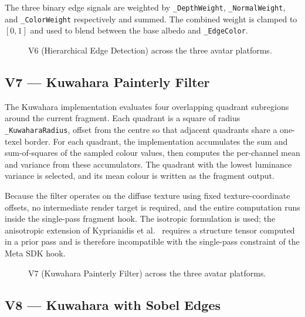 The three binary edge signals are weighted by \texttt{\_DepthWeight}, \texttt{\_NormalWeight}, and \texttt{\_ColorWeight} respectively and summed. The combined weight is clamped to $[0,1]$ and used to blend between the base albedo and \texttt{\_EdgeColor}.

\begin{figure}[H]
  \centering
  \caption{V6 (Hierarchical Edge Detection) across the three avatar platforms.}
  \label{fig:v6_impl}
\end{figure}

\subsection{V7 — Kuwahara Painterly Filter}
\label{sec:impl_v7}

The Kuwahara implementation evaluates four overlapping quadrant subregions around the current fragment. Each quadrant is a square of radius \texttt{\_KuwaharaRadius}, offset from the centre so that adjacent quadrants share a one-texel border. For each quadrant, the implementation accumulates the sum and sum-of-squares of the sampled colour values, then computes the per-channel mean and variance from these accumulators. The quadrant with the lowest luminance variance is selected, and its mean colour is written as the fragment output.

Because the filter operates on the diffuse texture using fixed texture-coordinate offsets, no intermediate render target is required, and the entire computation runs inside the single-pass fragment hook. The isotropic formulation is used; the anisotropic extension of Kyprianidis et al.~\cite{kyprianidis2009} requires a structure tensor computed in a prior pass and is therefore incompatible with the single-pass constraint of the Meta SDK hook.

\begin{figure}[H]
  \centering
  \caption{V7 (Kuwahara Painterly Filter) across the three avatar platforms.}
  \label{fig:v7_impl}
\end{figure}

\subsection{V8 — Kuwahara with Sobel Edges}
\label{sec:impl_v8}

